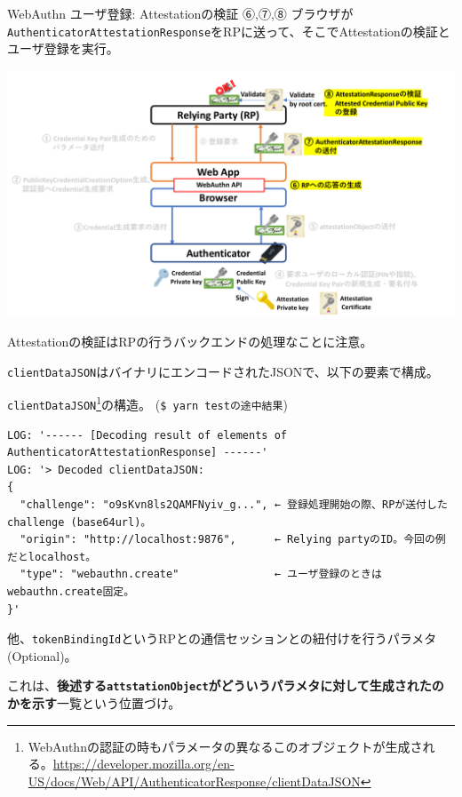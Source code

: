 \documentclass[12pt,dvipdfmx,uplatex]{beamer}
\begin{document}
\begin{frame}{WebAuthn ユーザ登録: Attestationの検証}
⑥,⑦,⑧ ブラウザが\texttt{AuthenticatorAttestationResponse}をRPに送って、そこでAttestationの検証とユーザ登録を実行。
\begin{center}
\includegraphics[width=0.9\linewidth]{Figs/webauthn-registration4.pdf}
\end{center}
\alert{Attestationの検証はRPの行うバックエンドの処理なことに注意。}
\end{frame}

\begin{frame}[fragile]
\texttt{clientDataJSON}はバイナリにエンコードされたJSONで、以下の要素で構成。
\begin{exampleblock}{\footnotesize \texttt{clientDataJSON}\footnote[frame]{\tiny WebAuthnの認証の時もパラメータの異なるこのオブジェクトが生成される。\url{https://developer.mozilla.org/en-US/docs/Web/API/AuthenticatorResponse/clientDataJSON}}の構造。 (\texttt{\$ yarn testの途中結果})}
\tiny
\begin{verbatim}
LOG: '------ [Decoding result of elements of AuthenticatorAttestationResponse] ------'
LOG: '> Decoded clientDataJSON:
{
  "challenge": "o9sKvn8ls2QAMFNyiv_g...", ← 登録処理開始の際、RPが送付したchallenge (base64url)。
  "origin": "http://localhost:9876",      ← Relying partyのID。今回の例だとlocalhost。
  "type": "webauthn.create"               ← ユーザ登録のときはwebauthn.create固定。
}'
\end{verbatim}
他、\texttt{tokenBindingId}というRPとの通信セッションとの紐付けを行うパラメタ (Optional)。
\end{exampleblock}
これは、\textbf{後述する\texttt{attstationObject}がどういうパラメタに対して生成されたのかを示す}一覧という位置づけ。
\end{frame}
\end{document}
